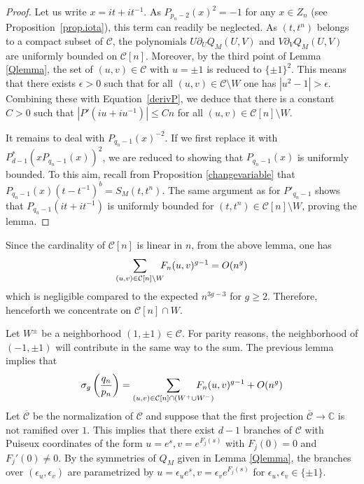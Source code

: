 \documentclass{amsart}
\newcommand{\C}{\mathbb{C}}
\newcommand{\calC}{\mathcal{C}}
\theoremstyle{definition}
\begin{document}
\begin{proof}
Let us write $x=it+it^{-1}$. As $P_{p_n-2}(x)^2=-1$  for any $x\in Z_n$ (see Proposition~\ref{prop.iota}), this term can readily be neglected. %
As $(t,t^n)$ belongs to a compact subset of $\calC$, the polynomials $U\partial_UQ_M(U,V)$ and $V\partial_VQ_M(U,V)$ are uniformly bounded on $\calC[n]$. Moreover, by the third point of Lemma \ref{Qlemma}, the set of $(u,v)\in \calC$ with $u=\pm 1$ is reduced to $\{\pm 1\}^2$. This means that there exists $\epsilon>0$ such that for all $(u,v)\in \calC\setminus W$ one has $|u^2-1|>\epsilon$. Combining these with Equation~\eqref{derivP}, we deduce that there is a constant $C>0$ such that $|P'(iu+iu^{-1})|\le Cn$ for all $(u,v)\in \calC[n]\setminus W$. 

It remains to deal with $P_{q_n-1}(x)^{-2}$. If we first replace it with $P^*_{d-1}(xP_{q_n-1}(x))^2$, we are reduced to showing that $P_{q_n-1}(x)$ is uniformly bounded.
To this aim, recall from Proposition \ref{changevariable} that $P_{q_n-1}(x)(t-t^{-1})^b=S_M(t,t^n)$. The same argument as for $P'_{q_n-1}$ shows that $P_{q_n-1}(it+it^{-1})$ is uniformly bounded for $(t,t^n)\in \calC[n]\setminus W$, proving the lemma. 
\end{proof}


Since the cardinality of $\calC[n]$ is linear in $n$, from the above lemma, one has $$\sum_{(u,v)\in \calC[n] \setminus W} \hspace{-0.2cm} F_n(u,v)^{g-1}=O(n^g)$$ which is negligible compared to the expected $n^{3g-3}$ for $g\ge 2$. Therefore, henceforth we concentrate on $\calC[n]\cap W$.

Let $W^{\pm }$ be a neighborhood $(1,\pm 1)\in \calC$. For parity reasons, the neighborhood of $(-1,\pm 1)$ will contribute in the same way to the sum. The previous lemma implies that 
$$\sigma_g \left(\frac{q_n}{p_n}\right)= \sum_{(u,v)\in \calC[n]\cap (W^+\cup W^-)} \hspace{-0.7cm} F_n(u,v)^{g-1}+O(n^g)$$
Let $\overline{\calC}$ be the normalization of $\calC$ and suppose that the first projection $\overline{\calC}\to\C$ is not ramified over $1$. This implies that there exist $d-1$ branches of $\calC$ with Puiseux coordinates of the form $u=e^s, v=e^{F_j(s)}$ with $F_j(0)=0$ and $F_j'(0)\ne 0$. By the symmetries of $Q_M$ given in Lemma \ref{Qlemma}, the branches over $(\epsilon_u,\epsilon_v)$ are parametrized by $u=\epsilon_u e^s,v=\epsilon_v e^{F_j(s)}$ for $\epsilon_u,\epsilon_v\in \{\pm 1\}$. 
\end{document}
